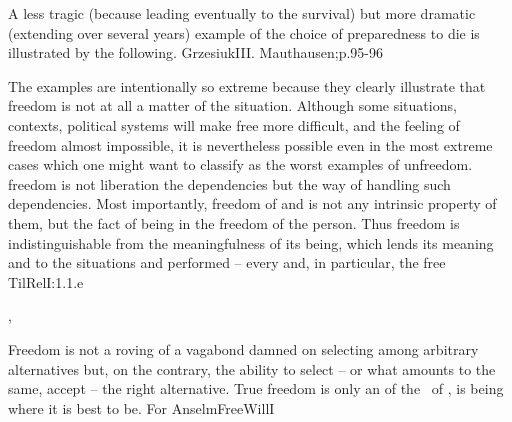 A less tragic (because leading eventually to the survival) but more dramatic
(extending over several years) example of the choice of preparedness to die is
illustrated by the following.  \citet{We carried soil in wheelbarrows, bringing
  it from some 
fifty meters all the time running at the very edge of the stone pit. The wall
was some tens of meters high and was here quite perpendicular. Running we
carried the soil and kapo was running along with us, beating us with the stick
in the shoulders, hands, heads, faces. [...] After some minutes I realised that
I won't manage a whole hour. He will kill me -- I thought. Good, but you too,
bastard, will get killed and I will have greater pleasure going to heaven in
such a company. Kapo was short. I decided to catch him when he gets behind me
and fall back. If everything goes fine, we both flutter down to the bottom of
the pit, and there it stops, the end.}{Grzesiuk}{III. Mauthausen;p.95-96}

The examples are intentionally so extreme because they clearly illustrate that 
freedom is not at all a matter of the  situation. Although some
situations, contexts, political systems will make free  more difficult,
and the feeling of freedom almost impossible, it is nevertheless
possible even in the most extreme cases which one might want to classify as the worst
examples of unfreedom.   freedom is not liberation  the
 dependencies but the way of handling such dependencies. Most
importantly,  freedom of  and  is not any
intrinsic property of them, but the fact of being  in the
freedom of the person. Thus  freedom is indistinguishable from the
meaningfulness of its being, which lends its meaning and  to the
 situations and performed  -- every  and, in
particular, the free \citet{act of meaning is related to the unconditioned
meaning viewed as an abyss of meaning.}{TilRel}{I:1.1.e}


\sep

\pa
{}Freedom is not a roving of a vagabond damned on selecting among arbitrary
alternatives but, on the contrary, the ability to select -- or what amounts to
the same, accept -- the right alternative.  True freedom is only an 
of the \nexus\ of \yes, is being where it is best to be. For \citet{one who is
  as he ought to be, and as it is expedient for him to be, such that he is
  unable to lose this state, is freer than one who is such that he can lose it
  and be led into what is indecent and inexpedient for him.}{AnselmFreeWill}{I}
 
